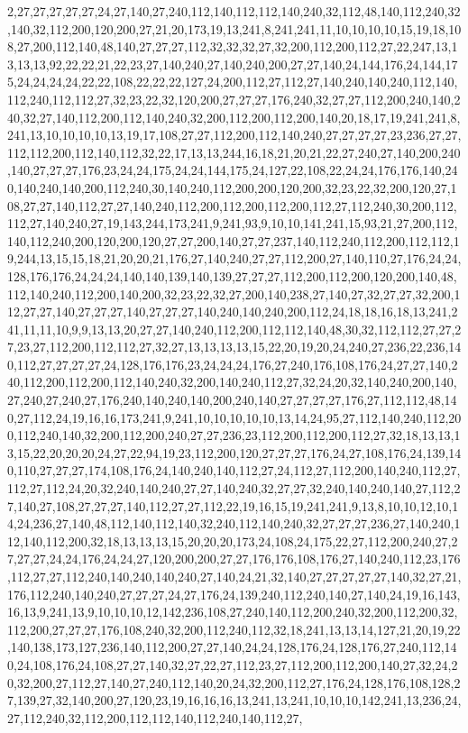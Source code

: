2,27,27,27,27,27,24,27,140,27,240,112,140,112,112,140,240,32,112,48,140,112,240,32,140,32,112,200,120,200,27,21,20,173,19,13,241,8,241,241,11,10,10,10,10,15,19,18,108,27,200,112,140,48,140,27,27,27,112,32,32,32,27,32,200,112,200,112,27,22,247,13,13,13,13,92,22,22,21,22,23,27,140,240,27,140,240,200,27,27,140,24,144,176,24,144,175,24,24,24,24,22,22,108,22,22,22,127,24,200,112,27,112,27,140,240,140,240,112,140,112,240,112,112,27,32,23,22,32,120,200,27,27,27,176,240,32,27,27,112,200,240,140,240,32,27,140,112,200,112,140,240,32,200,112,200,112,200,140,20,18,17,19,241,241,8,241,13,10,10,10,10,13,19,17,108,27,27,112,200,112,140,240,27,27,27,27,23,236,27,27,112,112,200,112,140,112,32,22,17,13,13,244,16,18,21,20,21,22,27,240,27,140,200,240,140,27,27,27,176,23,24,24,175,24,24,144,175,24,127,22,108,22,24,24,176,176,140,240,140,240,140,200,112,240,30,140,240,112,200,200,120,200,32,23,22,32,200,120,27,108,27,27,140,112,27,27,140,240,112,200,112,200,112,200,112,27,112,240,30,200,112,112,27,140,240,27,19,143,244,173,241,9,241,93,9,10,10,141,241,15,93,21,27,200,112,140,112,240,200,120,200,120,27,27,200,140,27,27,237,140,112,240,112,200,112,112,19,244,13,15,15,18,21,20,20,21,176,27,140,240,27,27,112,200,27,140,110,27,176,24,24,128,176,176,24,24,24,140,140,139,140,139,27,27,27,112,200,112,200,120,200,140,48,112,140,240,112,200,140,200,32,23,22,32,27,200,140,238,27,140,27,32,27,27,32,200,112,27,27,140,27,27,27,140,27,27,27,140,240,140,240,200,112,24,18,18,16,18,13,241,241,11,11,10,9,9,13,13,20,27,27,140,240,112,200,112,112,140,48,30,32,112,112,27,27,27,23,27,112,200,112,112,27,32,27,13,13,13,13,15,22,20,19,20,24,240,27,236,22,236,140,112,27,27,27,27,24,128,176,176,23,24,24,24,176,27,240,176,108,176,24,27,27,140,240,112,200,112,200,112,140,240,32,200,140,240,112,27,32,24,20,32,140,240,200,140,27,240,27,240,27,176,240,140,240,140,200,240,140,27,27,27,27,176,27,112,112,48,140,27,112,24,19,16,16,173,241,9,241,10,10,10,10,10,13,14,24,95,27,112,140,240,112,200,112,240,140,32,200,112,200,240,27,27,236,23,112,200,112,200,112,27,32,18,13,13,13,15,22,20,20,20,24,27,22,94,19,23,112,200,120,27,27,27,176,24,27,108,176,24,139,140,110,27,27,27,174,108,176,24,140,240,140,112,27,24,112,27,112,200,140,240,112,27,112,27,112,24,20,32,240,140,240,27,27,140,240,32,27,27,32,240,140,240,140,27,112,27,140,27,108,27,27,27,140,112,27,27,112,22,19,16,15,19,241,241,9,13,8,10,10,12,10,14,24,236,27,140,48,112,140,112,140,32,240,112,140,240,32,27,27,27,236,27,140,240,112,140,112,200,32,18,13,13,13,15,20,20,20,173,24,108,24,175,22,27,112,200,240,27,27,27,27,24,24,176,24,24,27,120,200,200,27,27,176,176,108,176,27,140,240,112,23,176,112,27,27,112,240,140,240,140,240,27,140,24,21,32,140,27,27,27,27,27,140,32,27,21,176,112,240,140,240,27,27,27,24,27,176,24,139,240,112,240,140,27,140,24,19,16,143,16,13,9,241,13,9,10,10,10,12,142,236,108,27,240,140,112,200,240,32,200,112,200,32,112,200,27,27,27,176,108,240,32,200,112,240,112,32,18,241,13,13,14,127,21,20,19,22,140,138,173,127,236,140,112,200,27,27,140,24,24,128,176,24,128,176,27,240,112,140,24,108,176,24,108,27,27,140,32,27,22,27,112,23,27,112,200,112,200,140,27,32,24,20,32,200,27,112,27,140,27,240,112,140,20,24,32,200,112,27,176,24,128,176,108,128,27,139,27,32,140,200,27,120,23,19,16,16,16,13,241,13,241,10,10,10,142,241,13,236,24,27,112,240,32,112,200,112,112,140,112,240,140,112,27,